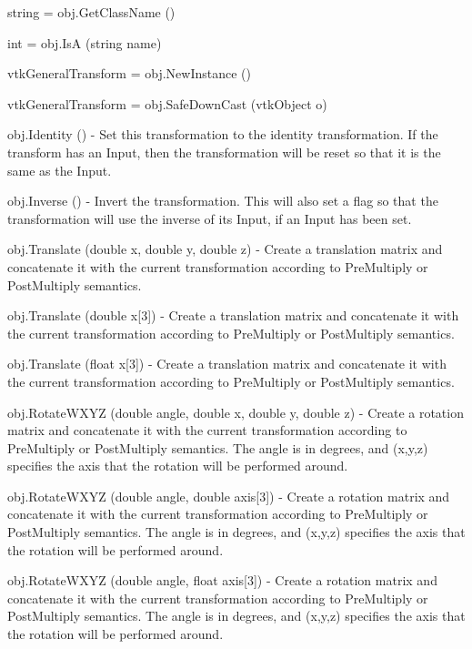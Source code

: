 \begin{DoxyItemize}
\item {\ttfamily string = obj.\-Get\-Class\-Name ()}  
\item {\ttfamily int = obj.\-Is\-A (string name)}  
\item {\ttfamily vtk\-General\-Transform = obj.\-New\-Instance ()}  
\item {\ttfamily vtk\-General\-Transform = obj.\-Safe\-Down\-Cast (vtk\-Object o)}  
\item {\ttfamily obj.\-Identity ()} -\/ Set this transformation to the identity transformation. If the transform has an Input, then the transformation will be reset so that it is the same as the Input.  
\item {\ttfamily obj.\-Inverse ()} -\/ Invert the transformation. This will also set a flag so that the transformation will use the inverse of its Input, if an Input has been set.  
\item {\ttfamily obj.\-Translate (double x, double y, double z)} -\/ Create a translation matrix and concatenate it with the current transformation according to Pre\-Multiply or Post\-Multiply semantics.  
\item {\ttfamily obj.\-Translate (double x\mbox{[}3\mbox{]})} -\/ Create a translation matrix and concatenate it with the current transformation according to Pre\-Multiply or Post\-Multiply semantics.  
\item {\ttfamily obj.\-Translate (float x\mbox{[}3\mbox{]})} -\/ Create a translation matrix and concatenate it with the current transformation according to Pre\-Multiply or Post\-Multiply semantics.  
\item {\ttfamily obj.\-Rotate\-W\-X\-Y\-Z (double angle, double x, double y, double z)} -\/ Create a rotation matrix and concatenate it with the current transformation according to Pre\-Multiply or Post\-Multiply semantics. The angle is in degrees, and (x,y,z) specifies the axis that the rotation will be performed around.  
\item {\ttfamily obj.\-Rotate\-W\-X\-Y\-Z (double angle, double axis\mbox{[}3\mbox{]})} -\/ Create a rotation matrix and concatenate it with the current transformation according to Pre\-Multiply or Post\-Multiply semantics. The angle is in degrees, and (x,y,z) specifies the axis that the rotation will be performed around.  
\item {\ttfamily obj.\-Rotate\-W\-X\-Y\-Z (double angle, float axis\mbox{[}3\mbox{]})} -\/ Create a rotation matrix and concatenate it with the current transformation according to Pre\-Multiply or Post\-Multiply semantics. The angle is in degrees, and (x,y,z) specifies the axis that the rotation will be performed around.  

\end{DoxyItemize}
